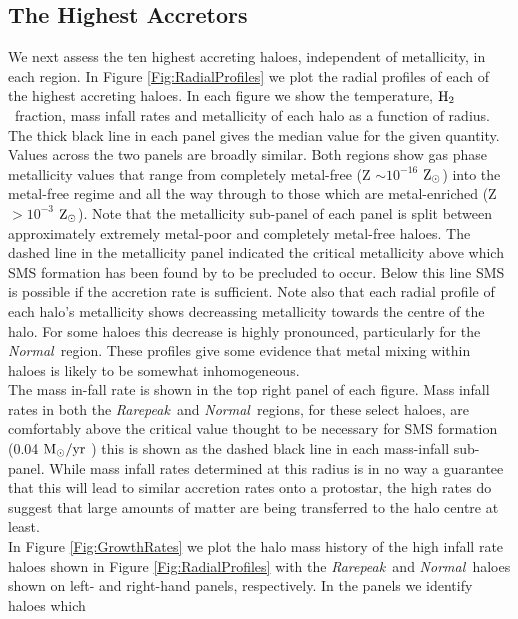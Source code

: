\documentclass[graphics, twocolumn, usenatbib]{mn2e}
\newcommand{\msolaryr} {$\rm{M_{\odot}/yr}~$}
\newcommand{\zsolarc} {$\rm{Z_{\odot}}$}
\newcommand{\molH} {$\rm{H_2}$~}
\newcommand{\rarepeak} {\textit{Rarepeak~}}
\newcommand{\normal} {\textit{Normal~}}
\begin{document}
\subsection{The Highest Accretors}
\indent We next assess the ten highest accreting haloes, independent of metallicity, in each region.
In Figure \ref{Fig:RadialProfiles} we plot the radial profiles of each of the highest
accreting haloes.
In each figure we show the temperature, \molH fraction, mass infall rates and
metallicity of each halo as a function of radius. The thick black line in each panel gives the
median value for the given quantity. Values across the two panels are broadly similar. Both regions
show gas phase metallicity values that range from completely metal-free (Z $\sim 10^{-16}$ \zsolarc)
into the metal-free regime and all the way through to those which are metal-enriched (Z $> 10^{-3}$
\zsolarc). Note that the metallicity sub-panel of each panel
is split between approximately extremely metal-poor and completely metal-free haloes. The dashed
line in the metallicity panel indicated the critical metallicity above which SMS formation
has been found by \cite{Chon_2020} to be precluded to occur. Below this line SMS is possible if the
accretion rate is sufficient. Note also that each radial profile of each halo's  metallicity shows
decreassing metallicity towards the centre of the halo. For some haloes this decrease is highly
pronounced, particularly for the \normal region. These profiles give some evidence that metal
mixing within haloes is likely to be somewhat inhomogeneous. \\
\indent The mass in-fall rate is shown in the top right panel of each figure. 
Mass infall rates in both the \rarepeak and \normal regions, for these select haloes, are
comfortably above the critical value thought to be necessary for SMS formation (0.04
\msolaryr \citep{Sakurai_2016}) this is shown as the dashed black line in each mass-infall sub-panel.
While mass infall rates determined at this radius is in no
way a guarantee that this will lead to similar accretion rates onto a protostar, the high rates do
suggest that large amounts of matter are being transferred to the halo centre at least. \\
\indent In Figure \ref{Fig:GrowthRates} we plot the halo mass history of the high infall
rate haloes shown in Figure \ref{Fig:RadialProfiles} with the \rarepeak and \normal haloes
shown on left- and right-hand panels, respectively. In the panels we identify haloes which
\end{document}
